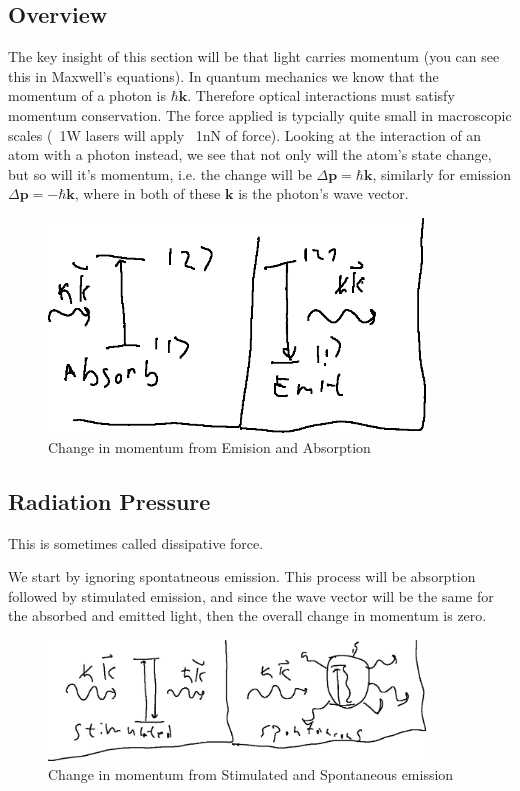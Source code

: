 \subsection{Overview}
The key insight of this section will be that light carries momentum (you can see this in Maxwell's equations).
In quantum mechanics we know that the momentum of a photon is $\hbar\bm{k}$. Therefore optical interactions must satisfy momentum conservation. The force applied is typcially quite small in macroscopic scales (~1W lasers will apply ~1nN of force).
Looking at the interaction of an atom with a photon instead, we see that not only will the atom's state change, but so will it's momentum, i.e. the change will be $\Delta\bm{p} = \hbar\bm{k}$, similarly for emission $\Delta\bm{p} = -\hbar\bm{k}$,
where in both of these $\bm{k}$ is the photon's wave vector.
\begin{figure}[h!]
	\centering
	\includegraphics[width=10cm]{images/11-26-4.png}
	\caption*{Change in momentum from Emision and Absorption}
\end{figure}
\subsection{Radiation Pressure}
This is sometimes called dissipative force. 

We start by ignoring spontatneous emission. This process will be absorption followed by stimulated emission, and since the wave vector will be the same for the absorbed and emitted light, then the overall change in momentum is zero.

\begin{figure}[h!]
	\centering
	\includegraphics[width=10cm]{images/11-26-5.png}
	\caption*{Change in momentum from Stimulated and Spontaneous emission}
\end{figure}

